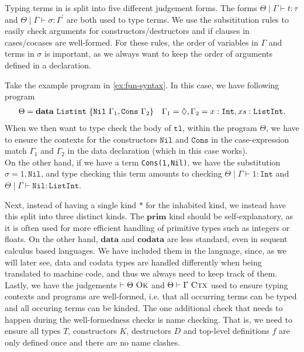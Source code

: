Typing terms in \surfacelang{} is split into five different judgement forms. 
The forms $\Theta\mid\Gamma\vdash t:\tau$ and $\Theta\mid\Gamma\vdash\sigma:\Gamma^{\prime}$ are both used to type terms.
We use the subsititution rules to easily check arguments for constructors/destructors and if clauses in cases/cocases are well-formed. 
For these rules, the order of variables in $\Gamma$ and terms in $\sigma$ is important, as we always want to keep the order of arguments defined in a declaration.
\begin{example}
  Take the example program in \cref{ex:fun-syntax}. 
  In this case, we have following program 
  \begin{align*}
    \Theta= \mathbf{data}\ \mathtt{Listint}\ \{\mathtt{Nil}\ \Gamma_1, \mathtt{Cons}\ \Gamma_2\} \quad 
    \Gamma_1=\Diamond, \Gamma_2 = x:\mathtt{Int}, xs:\mathtt{ListInt}.
  \end{align*}
  When we then want to type check the body of $\mathtt{tl}$, within the program $\Theta$, 
  we have to ensure the contexts for the constructors $\mathtt{Nil}$ and $\mathtt{Cons}$ in the case-expression match $\Gamma_1$ and $\Gamma_2$ in the data declaration (which in this case works).\\
  On the other hand, if we have a term \lstinline{Cons(1,Nil)}, we have the substitution $\sigma = 1,\mathtt{Nil}$, and type checking this term amounts to checking 
  $\Theta\mid\Gamma \vdash 1:\mathtt{Int}$ and $\Theta\mid\Gamma\vdash \mathtt{Nil}:\mathtt{ListInt}$.
\end{example}
Next, instead of having a single kind $*$ for the inhabited kind, we instead have this split into three distinct kinds. 
The $\mathbf{prim}$ kind should be self-explanatory, as it is often used for more efficient handling of primitive types such as integers or floats.
On the other hand, $\mathbf{data}$ and $\mathbf{codata}$ are less standard, even in sequent calculus based languages.
We have included them in the language, since, as we will later see, data and codata types are handled differently when being translated to machine code, and thus we always need to keep track of them.\\
Lastly, we have the judgements $\vdash \Theta\ \textsc{Ok}$ and $\Theta\vdash\Gamma\ \textsc{Ctx}$ used to ensure typing contexts and programs are well-formed, 
i.e. that all occurring terms can be typed and all occuring terms can be kinded.
The one additional check that needs to happen during the well-formedness checks is name checking.
That is, we need to ensure all types $T$, constructors $K$, destructors $D$ and top-level definitions $f$ are only defined once and there are no name clashes.
